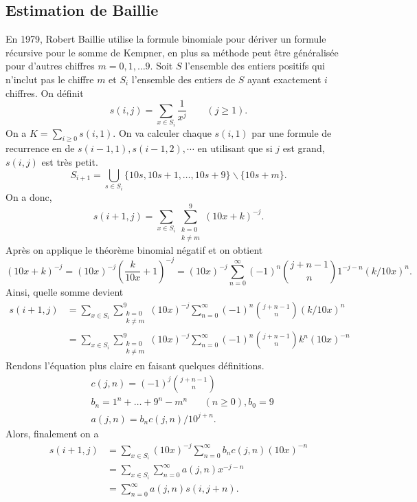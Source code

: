 \subsection{Estimation de Baillie}
En 1979, Robert Baillie \cite{baillie} utilise la formule binomiale pour
d\'eriver un formule r\'ecursive pour le somme de Kempner, en plus sa m\'ethode
peut \^etre g\'en\'eralis\'ee pour d'autres chiffres $m=0,1,\ldots9$. Soit $S$
l'ensemble des entiers positifs qui n'inclut pas le chiffre $m$ et $S_{i}$
l'ensemble des entiers de $S$ ayant exactement $i$ chiffres. On d\'efinit
\begin{equation*}
	s(i,j) = \sum_{x\in S_{i}}\frac{1}{x^{j}} \qquad (j\ge 1).
\end{equation*}
On a $K = \sum_{i\ge 0} s(i, 1)$. On va calculer chaque $s(i, 1)$ par une
formule de recurrence en de $s(i-1, 1), s(i-1, 2), \cdots$ en utilisant que
si $j$ est grand, $s(i, j)$ est tr\`es petit.
\[
	S_{i+1}=\bigcup_{s\in S_{i}}\{10s,10s+1,\ldots,10s+9\}\backslash\{10s+m\}.
\]
On a donc,
\[
	s(i+1, j) = \sum_{x\in S_{i}} \sum_{\substack{k=0\\ k\ne m}}^{9}
	(10x+k)^{-j}.
\]
Apr\`es on applique le th\'eor\`eme binomial n\'egatif et on obtient
\[
	(10x+k)^{-j} = (10x)^{-j} \left(\frac{k}{10x} + 1\right)^{-j} =
	(10x)^{-j}\sum_{n=0}^{\infty} (-1)^{n}\binom{j+n-1}{n}1^{-j-n}(k/10x)^{n}.
\]
Ainsi, quelle somme devient
\begin{equation}
	\begin{split}
		s(i+1, j) &= \sum_{x\in S_{i}} \sum_{\substack{k=0\\ k\ne m}}^{9}
		(10x)^{-j} \sum_{n=0}^{\infty} (-1)^{n} \binom{j+n-1}{n} (k/10x)^{n}\\
		&= \sum_{x\in S_{i}} \sum_{\substack{k=0\\ k\ne m}}^{9} (10x)^{-j}
		\sum_{n=0}^{\infty} (-1)^{n} \binom{j+n-1}{n} k^{n} (10x)^{-n}
	\end{split}
\end{equation}
Rendons l'\'equation plus claire en faisant quelques d\'efinitions.
\begin{align*}
	&c(j, n) = (-1)^{j} \binom{j+n-1}{n}\\
	&b_{n}=1^{n}+\ldots + 9^{n} - m^{n} \hspace{20pt} (n\ge0), b_{0} = 9\\
	&a(j, n) = b_{n}c(j, n)/10^{j+n}.
\end{align*}
Alors, finalement on a
\begin{equation}
	\begin{split}
		s(i+1, j) &= \sum_{x\in S_{i}}(10x)^{-j}\sum_{n=0}^{\infty} b_{n}c(j,
		n)(10x)^{-n}\\
		&=\sum_{x\in S_{i}} \sum_{n=0}^{\infty} a(j,n)x^{-j-n}\\
		&=\sum_{n=0}^{\infty}a(j,n)s(i, j+n).
	\end{split}
	\label{eq:recForm}
\end{equation}
